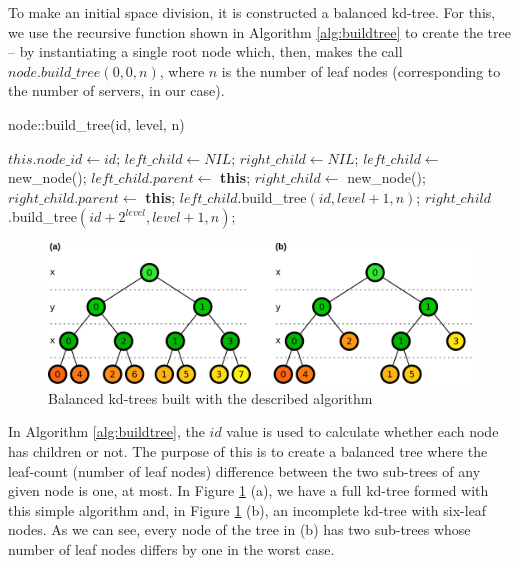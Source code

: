 \documentclass[acmjacm]{acmtrans2m}
\newcommand{\figurecaption}{Figure}
\begin{document}
To make an initial space division, it is constructed a balanced kd-tree. For this, we use the recursive function shown in Algorithm \ref{alg:buildtree} to create the tree -- by instantiating a single root node which, then, makes the call $node.build\_tree(0,0,n)$, where $n$ is the number of leaf nodes (corresponding to the number of servers, in our case).

\begin{algorithm}
\caption{node::build\_tree(id, level, n)}
\label{alg:buildtree}
\begin{algorithmic}
 \STATE $this.node\_id \leftarrow id$;
		\STATE $left\_child \leftarrow NIL$;
		\STATE $right\_child \leftarrow NIL$;
	\ELSE
		\STATE $left\_child \leftarrow$ new\_node();
		\STATE $left\_child.parent \leftarrow$ \textbf{this};
		\STATE $right\_child \leftarrow$ new\_node();
		\STATE $right\_child.parent \leftarrow$ \textbf{this};
		\STATE $left\_child$.build\_tree$(id, level + 1, n)$;
		\STATE $right\_child$.build\_tree$(id + 2^{level}, level + 1, n)$;
	\ENDIF
\end{algorithmic}
\end{algorithm}

\begin{figure}[!t]
	\centering
	\includegraphics[width=\linewidth]{images/kdtree}
	\caption{Balanced kd-trees built with the described algorithm}
	\label{fig:kdtree}
\end{figure}

In Algorithm \ref{alg:buildtree}, the $id$ value is used to calculate whether each node has children or not. The purpose of this is to create a balanced tree where the leaf-count (number of leaf nodes) difference between the two sub-trees of any given node is one, at most. In \figurecaption{} \ref{fig:kdtree} (a), we have a full kd-tree formed with this simple algorithm and, in \figurecaption{} \ref{fig:kdtree} (b), an incomplete kd-tree with six-leaf nodes. As we can see, every node of the tree in (b) has two sub-trees whose number of leaf nodes differs by one in the worst case.
\end{document}
